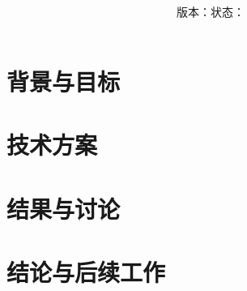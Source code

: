 \documentclass[12pt,fontset=none]{ctexart}
\title{\sffamily\ReportTitle\\[0.45em]\large\normalfont\ReportSubtitle}
\author{\ReportAuthors\\[0.45em]\small\ReportOrganization}
\date{\ReportDate\\[0.25em]\small 版本：\ReportVersion\quad 状态：\ReportStatus}
\begin{document}
\maketitle
\thispagestyle{plain}

\begin{abstract}

\end{abstract}

\tableofcontents
\clearpage

\section{背景与目标}\label{sec:background}


\section{技术方案}\label{sec:approach}


\section{结果与讨论}\label{sec:results}


\section{结论与后续工作}\label{sec:conclusion}


% 
\end{document}
